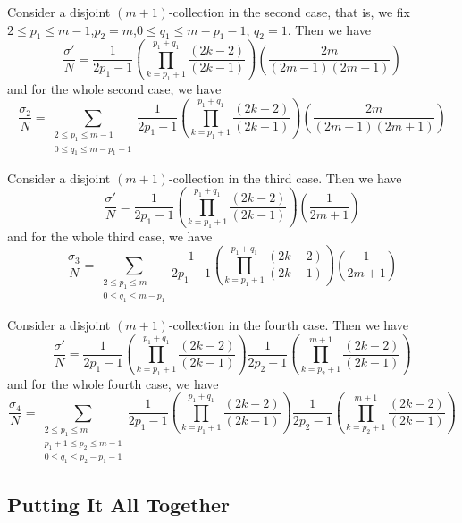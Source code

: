 \documentclass[11pt]{article}
\theoremstyle{definition}
\theoremstyle{definition}
\theoremstyle{plain}
\theoremstyle{plain}
\theoremstyle{plain}
\theoremstyle{definition}
\begin{document}
Consider a disjoint $(m+1)$-collection in the second case, that is, we fix $2\leq p_1\leq m-1$,$p_2=m$,$0\leq q_1\leq m-p_1-1$, $q_2 = 1$. Then we have
\begin{equation*}
\frac{\sigma'}{N} = \frac{1}{2p_1-1}\left(\prod\limits_{k=p_1+1}^{p_1+q_1}\frac{(2k-2)}{(2k-1)}\right)\left(\frac{2m}{(2m-1)(2m+1)}\right)
\end{equation*}
and for the whole second case, we have
\begin{equation*}
\frac{\sigma_2}{N} = \sum\limits_{\substack{2\leq p_1\leq m-1 \\ 0\leq q_1\leq m-p_1-1}}\frac{1}{2p_1-1}\left(\prod\limits_{k=p_1+1}^{p_1+q_1}\frac{(2k-2)}{(2k-1)}\right)\left(\frac{2m}{(2m-1)(2m+1)}\right)
\end{equation*}

Consider a disjoint $(m+1)$-collection in the third case. Then we have
\begin{equation*}
\frac{\sigma'}{N} = \frac{1}{2p_1-1}\left(\prod\limits_{k=p_1+1}^{p_1+q_1}\frac{(2k-2)}{(2k-1)}\right)\left(\frac{1}{2m+1}\right)
\end{equation*}
and for the whole third case, we have
\begin{equation*}
\frac{\sigma_3}{N} = \sum\limits_{\substack{2\leq p_1\leq m \\ 0\leq q_1\leq m-p_1}}\frac{1}{2p_1-1}\left(\prod\limits_{k=p_1+1}^{p_1+q_1}\frac{(2k-2)}{(2k-1)}\right)\left(\frac{1}{2m+1}\right)
\end{equation*}

Consider a disjoint $(m+1)$-collection in the fourth case. Then we have
\begin{equation*}
\frac{\sigma'}{N} = \frac{1}{2p_1-1}\left(\prod\limits_{k=p_1+1}^{p_1+q_1}\frac{(2k-2)}{(2k-1)}\right)\frac{1}{2p_2-1}\left(\prod\limits_{k=p_2+1}^{m+1}\frac{(2k-2)}{(2k-1)}\right)
\end{equation*}
and for the whole fourth case, we have
\begin{equation*}
\frac{\sigma_4}{N} = \sum\limits_{\substack{2\leq p_1\leq m \\ p_1+1\leq p_2 \leq m-1 \\ 0\leq q_1\leq p_2-p_1-1 }}\frac{1}{2p_1-1}\left(\prod\limits_{k=p_1+1}^{p_1+q_1}\frac{(2k-2)}{(2k-1)}\right)\frac{1}{2p_2-1}\left(\prod\limits_{k=p_2+1}^{m+1}\frac{(2k-2)}{(2k-1)}\right)
\end{equation*}

\subsection{Putting It All Together}
\end{document}
